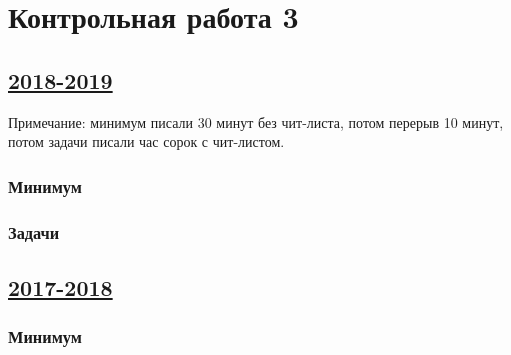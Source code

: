 \newpage
\thispagestyle{empty}
\section{Контрольная работа 3}



\subsection[2018-2019]{\hyperref[sec:sol_kr_03_2018_2019]{2018-2019}}
\label{sec:kr_03_2018_2019}

Примечание: минимум писали 30 минут без чит-листа, потом перерыв 10 минут, 
потом задачи писали час сорок с чит-листом. 

\subsubsection*{Минимум}



\subsubsection*{Задачи}






\subsection[2017-2018]{\hyperref[sec:sol_kr_03_2017_2018]{2017-2018}}
\label{sec:kr_03_2017_2018}

\subsubsection*{Минимум}

